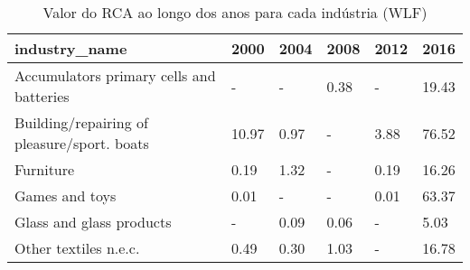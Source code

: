 \begin{table}
\centering
\caption{Valor do RCA ao longo dos anos para cada indústria (WLF)}
\begin{tabular}{p{6cm}p{1.5cm}p{1.5cm}p{1.5cm}p{1.5cm}p{1.5cm}}
\toprule
                              industry\_name &  2000 & 2004 & 2008 & 2012 &  2016 \\
\midrule
   Accumulators primary cells and batteries &     - &    - & 0.38 &    - & 19.43 \\
Building/repairing of pleasure/sport. boats & 10.97 & 0.97 &    - & 3.88 & 76.52 \\
                                  Furniture &  0.19 & 1.32 &    - & 0.19 & 16.26 \\
                             Games and toys &  0.01 &    - &    - & 0.01 & 63.37 \\
                   Glass and glass products &     - & 0.09 & 0.06 &    - &  5.03 \\
                      Other textiles n.e.c. &  0.49 & 0.30 & 1.03 &    - & 16.78 \\
\bottomrule
\end{tabular}
\end{table}
